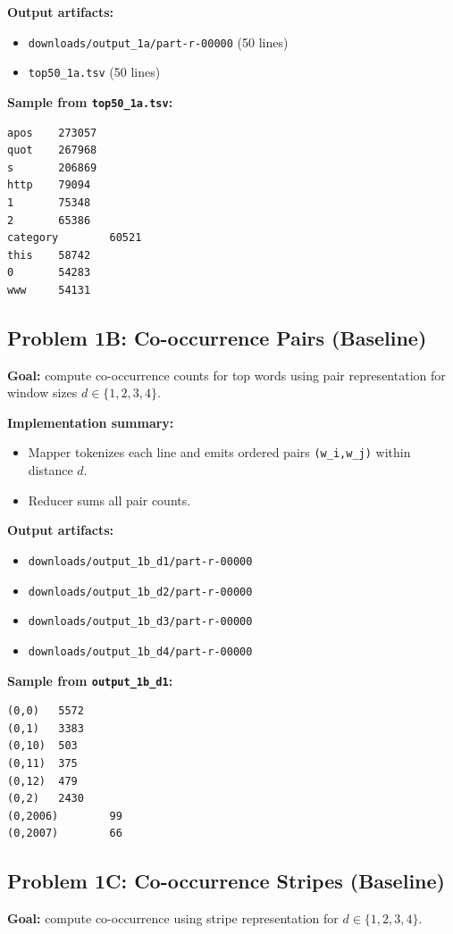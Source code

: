 \documentclass[11pt]{article}
\begin{document}
\textbf{Output artifacts:}
\begin{itemize}[leftmargin=*]
  \item \texttt{downloads/output\_1a/part-r-00000} (50 lines)
  \item \texttt{top50\_1a.tsv} (50 lines)
\end{itemize}

\textbf{Sample from \texttt{top50\_1a.tsv}:}
\begin{lstlisting}
apos    273057
quot    267968
s       206869
http    79094
1       75348
2       65386
category        60521
this    58742
0       54283
www     54131
\end{lstlisting}

\subsection{Problem 1B: Co-occurrence Pairs (Baseline)}
\textbf{Goal:} compute co-occurrence counts for top words using pair representation for window sizes $d \in \{1,2,3,4\}$.

\textbf{Implementation summary:}
\begin{itemize}[leftmargin=*]
  \item Mapper tokenizes each line and emits ordered pairs \texttt{(w\_i,w\_j)} within distance $d$.
  \item Reducer sums all pair counts.
\end{itemize}

\textbf{Output artifacts:}
\begin{itemize}[leftmargin=*]
  \item \texttt{downloads/output\_1b\_d1/part-r-00000}
  \item \texttt{downloads/output\_1b\_d2/part-r-00000}
  \item \texttt{downloads/output\_1b\_d3/part-r-00000}
  \item \texttt{downloads/output\_1b\_d4/part-r-00000}
\end{itemize}

\textbf{Sample from \texttt{output\_1b\_d1}:}
\begin{lstlisting}
(0,0)   5572
(0,1)   3383
(0,10)  503
(0,11)  375
(0,12)  479
(0,2)   2430
(0,2006)        99
(0,2007)        66
\end{lstlisting}

\subsection{Problem 1C: Co-occurrence Stripes (Baseline)}
\textbf{Goal:} compute co-occurrence using stripe representation for $d \in \{1,2,3,4\}$.
\end{document}
